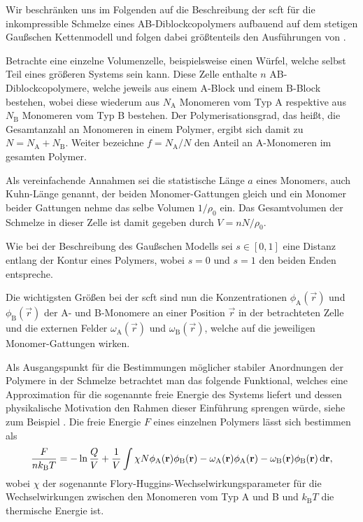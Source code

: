 Wir beschränken uns im Folgenden auf die Beschreibung der \ac{scft} für die inkompressible Schmelze eines AB-Diblockcopolymers aufbauend auf dem stetigen Gaußschen Kettenmodell und folgen dabei größtenteils den Ausführungen von \textcite{Matsen:1994bz,Stasiak:2011ba}.

Betrachte eine einzelne Volumenzelle, beispielsweise einen Würfel, welche selbst Teil eines größeren Systems sein kann.
Diese Zelle enthalte $n$ AB-Diblockcopolymere, welche jeweils aus einem A-Block und einem B-Block bestehen, wobei diese wiederum aus $N_{\mathrm{A}}$ Monomeren vom Typ A respektive aus $N_{\mathrm{B}}$ Monomeren vom Typ B bestehen.
Der Polymerisationsgrad, das heißt, die Gesamtanzahl an Monomeren in einem Polymer, ergibt sich damit zu $N = N_{\mathrm{A}} + N_{\mathrm{B}}$.
Weiter bezeichne $f = N_{\mathrm{A}} / N$ den Anteil an A-Monomeren im gesamten Polymer.

Als vereinfachende Annahmen sei die statistische Länge $a$ eines Monomers, auch Kuhn-Länge genannt, der beiden Monomer-Gattungen gleich und ein Monomer beider Gattungen nehme das selbe Volumen $1 / \rho_{0}$ ein.
Das Gesamtvolumen der Schmelze in dieser Zelle ist damit gegeben durch $V = n N / \rho_{0}$.

Wie bei der Beschreibung des Gaußschen Modells sei $s \in [0, 1]$ eine Distanz entlang der Kontur eines Polymers, wobei $s = 0$ und $s = 1$ den beiden Enden entspreche.

Die wichtigsten Größen bei der \ac{scft} sind nun die Konzentrationen $\phi_{\mathrm{A}}(\vec{r})$ und $\phi_{\mathrm{B}}(\vec{r})$ der A- und B-Monomere an einer Position $\vec{r}$ in der betrachteten Zelle und die externen Felder $\omega_{\mathrm{A}}(\vec{r})$ und $\omega_{\mathrm{B}}(\vec{r})$, welche auf die jeweiligen Monomer-Gattungen wirken.

Als Ausgangspunkt für die Bestimmungen möglicher stabiler Anordnungen der Polymere in der Schmelze betrachtet man das folgende Funktional, welches eine Approximation für die sogenannte freie Energie des Systems liefert und dessen physikalische Motivation den Rahmen dieser Einführung sprengen würde, siehe zum Beispiel \cite{Matsen:2006ud,Fredrickson:2006th}.
Die freie Energie $F$ eines einzelnen Polymers lässt sich bestimmen als
\begin{equation}
\label{eq:einleitung:freie_energie}
    \frac{F}{nk_{\mathrm{B}}T} = - \ln \frac{Q}{V} + \frac{1}{V} \int \chi N \phi_{\mathrm{A}}(\mathbf{r}) \phi_{\mathrm{B}}(\mathbf{r}) - \omega_{\mathrm{A}}(\mathbf{r}) \phi_{\mathrm{A}}(\mathbf{r}) - \omega_{\mathrm{B}}(\mathbf{r}) \phi_{\mathrm{B}}(\mathbf{r}) \mathop{}\!\mathrm{d} \mathbf{r},
\end{equation}
wobei $\chi$ der sogenannte Flory-Huggins-Wechselwirkungsparameter für die Wechselwirkungen zwischen den Monomeren vom Typ A und B und $k_{\mathrm{B}} T$ die thermische Energie ist.


